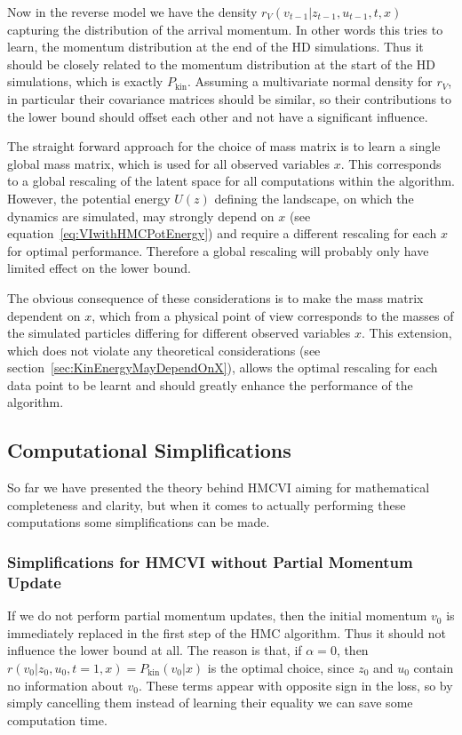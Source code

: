 \documentclass[12pt]{scrartcl}
\begin{document}
Now in the reverse model we have the density $r_V(v_{t-1}|z_{t-1}, u_{t-1}, t, x)$ capturing the distribution of the arrival momentum. In other words this tries to learn, the momentum distribution at the end of the HD simulations. Thus it should be closely related to the momentum distribution at the start of the HD simulations, which is exactly $P_\textrm{kin}$. Assuming a multivariate normal density for $r_V$, in particular their covariance matrices should be similar, so their contributions to the lower bound should offset each other and not have a significant influence.

The straight forward approach for the choice of mass matrix is to learn a single global mass matrix, which is used for all observed variables $x$. This corresponds to a global rescaling of the latent space for all computations within the algorithm. However, the potential energy $U(z)$ defining the landscape, on which the dynamics are simulated, may strongly depend on $x$ (see equation~\eqref{eq:VIwithHMCPotEnergy}) and require a different rescaling for each $x$ for optimal performance. Therefore a global rescaling will probably only have limited effect on the lower bound.

The obvious consequence of these considerations is to make the mass matrix dependent on $x$, which from a physical point of view corresponds to the masses of the simulated particles differing for different observed variables $x$. This extension, which does not violate any theoretical considerations (see section~\ref{sec:KinEnergyMayDependOnX}), allows the optimal rescaling for each data point to be learnt and should greatly enhance the performance of the algorithm.

\subsection{Computational Simplifications}

So far we have presented the theory behind HMCVI aiming for mathematical completeness and clarity, but when it comes to actually performing these computations some simplifications can be made.

\subsubsection{Simplifications for HMCVI without Partial Momentum Update}
\label{sec:SimplificationWithoutPartialMomentumUpdate}
If we do not perform partial momentum updates, then the initial momentum $v_0$ is immediately replaced in the first step of the HMC algorithm. Thus it should not influence the lower bound at all. The reason is that, if $\alpha = 0$, then $r(v_0|z_0, u_0, t=1, x) = P_\textrm{kin}(v_0|x)$ is the optimal choice, since $z_0$ and $u_0$ contain no information about $v_0$. These terms appear with opposite sign in the loss, so by simply cancelling them instead of learning their equality we can save some computation time.
\end{document}
